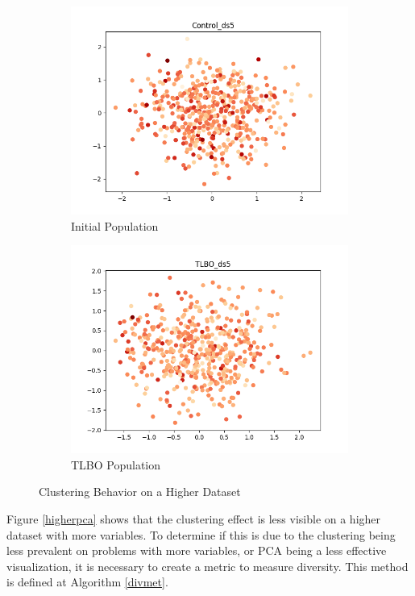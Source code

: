 \documentclass[11pt, letterpaper, onecolumn]{article}
\begin{document}
\begin{figure}[h!]
  \centering
  \begin{subfigure}[!h]{0.4\linewidth}
    \includegraphics[width=\linewidth]{graphs/Control_ds5__pca.png}
    \caption{Initial Population}
  \end{subfigure}
  \begin{subfigure}[!h]{0.4\linewidth}
    \includegraphics[width=\linewidth]{graphs/TLBO_ds5__pca.png}
    \caption{TLBO Population}
  \end{subfigure}
  \caption{\label{higherpca}Clustering Behavior on a Higher Dataset}
  \label{fig:coffee}
\end{figure}

Figure \ref{higherpca} shows that the clustering effect is less visible on a higher dataset with more variables. To determine if this is due to the clustering being less prevalent on problems with more variables, or PCA being a less effective visualization, it is necessary to create a metric to measure diversity. This method is defined at Algorithm \ref{divmet}. 
\end{document}
